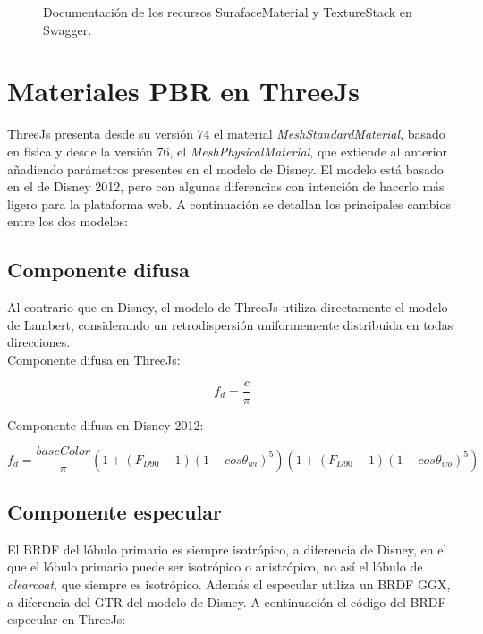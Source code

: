   \begin{figure}[H]
    \vspace{0.5cm}
    \centering
    \caption{Documentaci\'on de los recursos SurafaceMaterial y TextureStack en Swagger.}
    \vspace{0.5cm}
  \end{figure}


  \section{Materiales PBR en ThreeJs}

  ThreeJs presenta desde su versi\'on 74 el material \textit{MeshStandardMaterial}, basado en f\'isica y desde la versi\'on
  76, el \textit{MeshPhysicalMaterial}, que extiende al anterior a\~nadiendo par\'ametros presentes en el modelo de Disney.
  El modelo est\'a basado en el de Disney 2012, pero con algunas diferencias con intenci\'on de hacerlo m\'as ligero
  para la plataforma web. A continuaci\'on se detallan los principales cambios entre los dos modelos:

    \subsection{Componente difusa}
    Al contrario que en Disney, el modelo de ThreeJs utiliza directamente el modelo de Lambert, considerando un retrodispersi\'on
    uniformemente distribuida en todas direcciones.\\

    Componente difusa en ThreeJs:

    \begin{equation}
      f_d = \frac{c}{\pi}
    \end{equation}
    \singlespacing

    Componente difusa en Disney 2012:

    \begin{equation}
      f_d = \frac{baseColor}{\pi}
      \left(  1 + (F_{D90} - 1)(1 - cos\theta_{wi})^5  \right)
      \left(  1 + (F_{D90} - 1)(1 - cos\theta_{wo})^5  \right)
    \end{equation}
    \singlespacing


    \subsection{Componente especular}
    El BRDF del l\'obulo primario es siempre isotr\'opico, a diferencia de Disney, en el que el l\'obulo primario
    puede ser isotr\'opico o anistr\'opico, no as\'i el l\'obulo de \textit{clearcoat}, que siempre es isotr\'opico.
    Adem\'as el especular utiliza un BRDF GGX, a diferencia del GTR del modelo de Disney. A continuaci\'on el c\'odigo
    del BRDF especular en ThreeJs:

